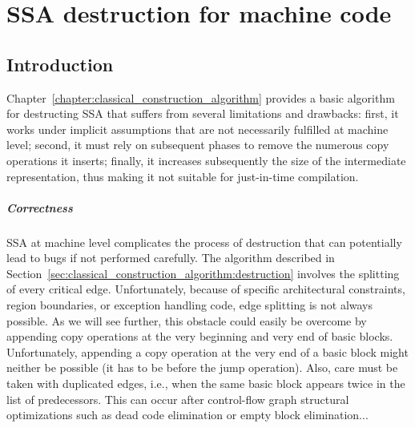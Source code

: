 \chapter{SSA destruction for machine code }


\label{chapter:alternative_ssa_destruction_algorithm}


\section{Introduction}
Chapter~\ref{chapter:classical_construction_algorithm} provides a basic algorithm for destructing SSA that suffers from several limitations and drawbacks: 
first, it works under implicit assumptions that are not necessarily fulfilled at machine level; 
second, it must rely on subsequent phases to remove the numerous copy operations it inserts; 
finally, it increases subsequently the size of the intermediate representation, thus making it not suitable for just-in-time compilation.

\paragraph{Correctness}
SSA at machine level complicates the process of destruction that can potentially lead to bugs if not performed carefully. 
The algorithm described in Section~\ref{sec:classical_construction_algorithm:destruction} involves the splitting of every critical edge. 
Unfortunately, because of specific architectural constraints, region boundaries, or exception handling code, edge splitting is not always possible. 
As we will see further, this obstacle could easily be overcome by appending copy operations at the very beginning and very end of basic blocks. 
Unfortunately, appending a copy operation at the very end of a basic block might neither be possible (it has to be before the jump operation). 
Also, care must be taken with duplicated edges, i.e., when the same basic block appears twice in the list of predecessors. 
This can occur after control-flow graph structural optimizations such as dead code elimination or empty block elimination... 

